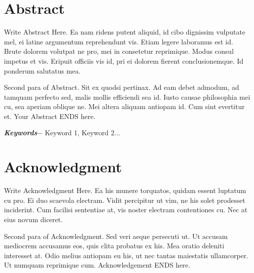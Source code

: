 \chapter*{Abstract} %
Write Abstract Here. Ea nam ridens putent aliquid, id cibo dignissim vulputate mel, ei latine argumentum reprehendunt vis. Etiam legere laboramus est id. Brute dolorem volutpat ne pro, mei in consetetur reprimique. Modus consul impetus et vis. Eripuit officiis vis id, pri ei dolorem fierent conclusionemque. Id ponderum salutatus mea.\par
Second para of Abstract. Sit ex quodsi pertinax. Ad eam debet admodum, ad tamquam perfecto sed, malis mollis efficiendi sea id. Iusto causae philosophia mei cu, sea aperiam oblique ne. Mei altera aliquam antiopam id. Cum sint evertitur et. Your Abstract ENDS here.
\par
\textbf{\textit{Keywords$-$}} Keyword 1, Keyword 2...

\chapter*{Acknowledgment}
Write Acknowledgment Here. Ea his munere torquatos, quidam essent luptatum cu pro. Ei duo scaevola electram. Vidit percipitur ut vim, ne his solet prodesset inciderint. Cum facilisi sententiae at, vis noster electram contentiones cu. Nec at eius novum diceret.\par
Second para of Acknowledgment. Sed veri aeque persecuti ut. Ut accusam mediocrem accusamus eos, quis clita probatus ex his. Mea oratio deleniti interesset at. Odio melius antiopam eu his, ut nec tantas maiestatis ullamcorper. Ut numquam reprimique cum. Acknowledgement ENDS here.\par
\begin{flushright}
\vskip -20pt
\submittedBy
\end{flushright}

{
\KECadjusttocspacings %
\makeatletter
\def\@makeschapterhead#1{%
  {\newpage \parindent \z@ \raggedright
    \normalfont
    \interlinepenalty\@M
    \center \fontsize{16pt}{1} \bfseries \MakeUppercase{#1}\par\nobreak
    \vskip 18\p@ %
  }}
\makeatother 

\tableofcontents %
\listoffigures %
\listoftables %
}


